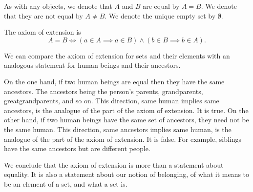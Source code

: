 
As with any objects, we denote that $A$ and $B$ are equal
by $A = B$.
We denote that they are not equal by $A \neq B$.
We denote the unique empty set by $\emptyset$.


The axiom of extension is
\[
  A = B \Leftrightarrow (a \in A \implies a \in B) \land (b \in B \implies b \in A).
\]



We can compare the axiom of extension
for sets and their elements with an
analogous statement
for human beings and their ancestors.

On the one hand, if two human beings are equal then they have the same ancestors.
The ancestors being the person's parents, grandparents, greatgrandparents, and so on.
This direction, same human implies same ancestors, is the analogue of the  part of the axiom of extension.
It is true.
On the other hand, if two human beings have the same set of ancestors, they need not be the same human.
This direction, same ancestors implies same human, is the analogue of the  part of the axiom of extension.
It is false.
For example, siblings have the same ancestors but are different people.

We conclude that the axiom of extension
is more than a statement about equality.
It is also a statement about our notion of
belonging, of what it means
to be an element of a set, and what a set is.

\blankpage
